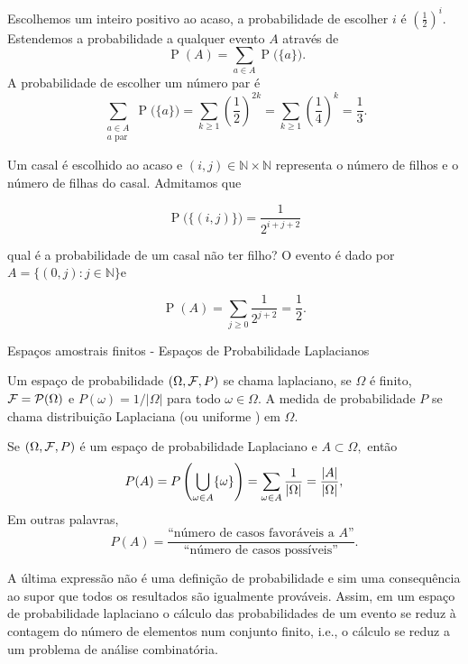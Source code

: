 \begin{frame}
 \begin{exem}
  Escolhemos um inteiro positivo ao acaso, a probabilidade de escolher ${i}$ é ${(\frac 12)^i}$. Estendemos a probabilidade a qualquer evento ${A}$ através de $$\displaystyle \mathop{\ P}(A) = \sum_{a\in A} \mathop{P}\big(\{a\}\big).$$ A probabilidade de escolher um número par é 
  $$\displaystyle  \sum_{\substack{a\in A\\a\textrm{ par}}} \mathop{ P}\big(\{a\}\big) = \sum_{k\geq 1} \left( \frac 12 \right)^{2k} = \sum_{k\geq 1} \left( \frac 14 \right)^{k} = \frac 13.$$
 \end{exem}
 \begin{exem}
Um casal é escolhido ao acaso e ${(i,j)\in{\mathbb N}\times{\mathbb N}}$ representa o número de filhos e o número de filhas do casal. Admitamos que

$$\displaystyle  \mathop{ P}\big(\{(i,j)\}\big) = \frac 1{2^{i+j+2}}$$

qual é a probabilidade de um casal não ter filho? O evento é dado por $ {A=\big\{(0,j)\colon j\in{\mathbb N}\big\}} $e

$$\displaystyle \mathop{ P}(A) = \sum_{j\geq 0} \frac 1{2^{j+2}} = \frac 12.$$
\end{exem}
\end{frame}

\begin{frame}{Espaços amostrais finitos - Espaços de Probabilidade Laplacianos}
\begin{defi}
 Um espaço de probabilidade $(\Omega, {\cal F}, P)$  se chama laplaciano, se
$\Omega$ é finito,  ${\cal F}=\mathcal{P}(\Omega )$ e $P(\omega)=1/|\Omega|$
para todo $\omega \in \Omega.$ A medida de probabilidade $P$ se chama
distribuição Laplaciana (ou uniforme ) em $\Omega.$
\end{defi}
\begin{nota}
 Se $(\Omega, {\cal F}, P)$ é um espaço de probabilidade Laplaciano e $A \subset \Omega,$ então 
 $$
 P(A)= P\left(\bigcup_{\omega\in A} \{{\omega}\}\right) = \sum_{\omega\in A}\frac{1}{|\Omega|}=\frac{|A|}{|\Omega|}, 
 $$
Em outras palavras, 
\begin{equation}
\label{flap}
P(A) = \frac{\text{``número de casos favoráveis a $A$''}}{\text{``número de
casos possíveis''}}.
\end{equation}
\end{nota}

A última expressão não é uma definição de probabilidade e sim uma consequência
ao supor que todos os resultados são igualmente prováveis. Assim, em um espaço de
probabilidade laplaciano o cálculo das probabilidades de um evento se reduz à
contagem do número de elementos num conjunto finito, i.e., o cálculo se reduz a
um problema de análise combinatória.
\end{frame}

